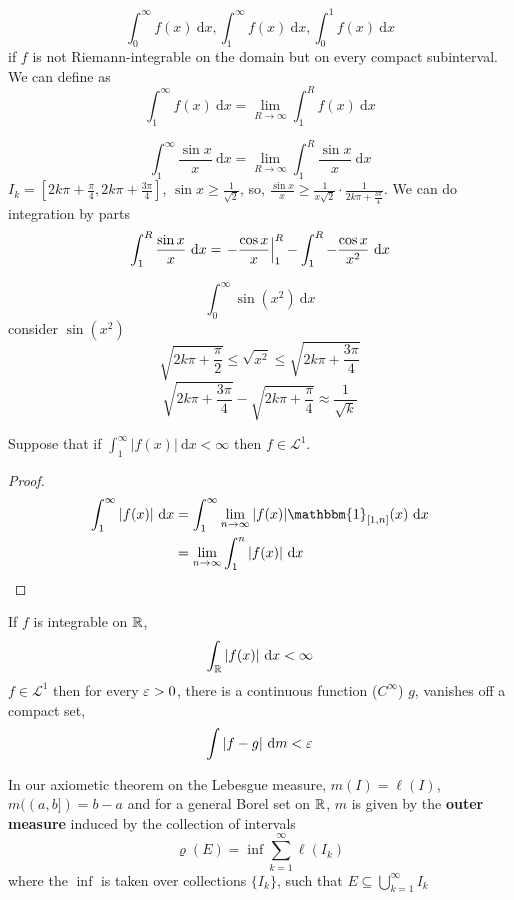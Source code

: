 \begin{definition}
  \[\int_0^\infty f(x)\ \mathrm{d}x, \int_1^\infty f(x)\ \mathrm{d}x, \int_0^1 f(x)\ \mathrm{d}x\]
  if $f$ is not Riemann-integrable on the domain but on every compact subinterval.
  We can define as
  \[\int_1^\infty f(x)\ \mathrm{d}x = \lim_{R\to\infty}\int_1^Rf(x) \ \mathrm{d}x\]

\end{definition}
\begin{example}
  \[\int_1^\infty \frac{\sin x}{x}\ \mathrm{d}x = \lim_{R\to\infty}\int_1^R\frac{\sin x}x \ \mathrm{d}x\]
  $I_k = [2k\pi + \frac\pi4, 2k\pi + \frac{3\pi}4]$, $\sin x \ge \frac1{\sqrt2}$, so, $\frac{\sin x}{x} \ge \frac1{x\sqrt2}\cdot \frac{1}{2k\pi + \frac{3\pi}4}$.
  We can do integration by parts
  $$
    \int_1^R \frac{\sin x}x \ \mathrm{d}x = \left.-\frac{\cos x}x\right|_1^R - \int_1^R -\frac{\cos x}{x^2} \ \mathrm{d}x \\
  $$
\end{example}

\begin{example}
  \[\int_0^\infty \sin(x^2)\ \mathrm{d}x\]
  consider $\sin(x^2)$
  \[
    \sqrt{2k\pi + \frac\pi2} \le \sqrt{x^2} \le \sqrt{2k\pi + \frac{3\pi}4} 
  \]
  \[\sqrt{2k\pi + \frac{3\pi}4} - \sqrt{2k\pi + \frac{\pi}4} \approx \frac1{\sqrt{k}}\]
\end{example}

\begin{lemma}
  Suppose that if $\int_1^\infty |f(x)|\ \mathrm{d}x < \infty$ then $f\in \mathcal{L}^1$.
\end{lemma}
\begin{proof}
  \begin{align*}
    \int_1^\infty |f(x)|\ \mathrm{d}x &= \int_1^\infty \lim_{n\to\infty}|f(x)|\mathbbm{1}_{[1, n]}(x)\ \mathrm{d}x \\
    &= \lim_{n\to\infty}\int_1^n |f(x)|\ \mathrm{d}x
  \end{align*}
\end{proof}

\begin{theorem}
  If $f$ is integrable on $\mathbb R$, $$\int_\mathbb R |f(x)|\ \mathrm{d}x < \infty$$ $f \in \mathcal{L}^1$ 
  then for every $\varepsilon > 0$, there is a continuous function ($C^\infty$) $g$, vanishes off a compact set, 
  \[\int |f - g| \ \mathrm{d}m < \eps\]
\end{theorem}

\begin{definition}
  In our axiometic theorem on the Lebesgue measure, $m(I) = \ell(I)$, $m((a, b]) = b-a$
  and for a general Borel set on $\mathbb R$, $m$ is given by the \textbf{outer measure} induced by the collection of intervals
  \[\varrho(E) = \inf \sum_{k=1}^\infty \ell(I_k)\]
  where the $\inf$ is taken over collections $\{I_k\}$, such that $E \subseteq \bigcup_{k=1}^\infty I_k$
\end{definition}

